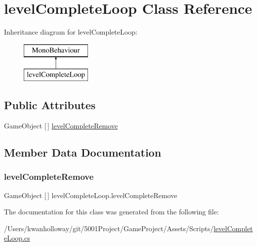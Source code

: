 \hypertarget{classlevel_complete_loop}{}\section{level\+Complete\+Loop Class Reference}
\label{classlevel_complete_loop}
Inheritance diagram for level\+Complete\+Loop\+:\begin{figure}[H]
\begin{center}
\leavevmode
\includegraphics[height=2.000000cm]{classlevel_complete_loop}
\end{center}
\end{figure}
\subsection*{Public Attributes}
\begin{DoxyCompactItemize}
\item 
Game\+Object \mbox{[}$\,$\mbox{]} \hyperlink{classlevel_complete_loop_adfbef5a438c566c7762842f7d5102b67}{level\+Complete\+Remove}
\end{DoxyCompactItemize}


\subsection{Member Data Documentation}
\mbox{\label{classlevel_complete_loop_adfbef5a438c566c7762842f7d5102b67}} 
\subsubsection{\texorpdfstring{level\+Complete\+Remove}{levelCompleteRemove}}
{\footnotesize\ttfamily Game\+Object \mbox{[}$\,$\mbox{]} level\+Complete\+Loop.\+level\+Complete\+Remove}



The documentation for this class was generated from the following file\+:\begin{DoxyCompactItemize}
\item 
/\+Users/kwanholloway/git/5001\+Project/\+Game\+Project/\+Assets/\+Scripts/\hyperlink{level_complete_loop_8cs}{level\+Complete\+Loop.\+cs}\end{DoxyCompactItemize}
